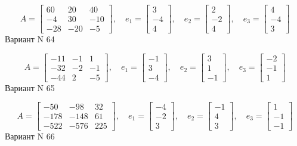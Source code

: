 \documentclass[11pt]{report}
\begin{document}
$$A = \left[\begin{matrix}60 & 20 & 40\\-4 & 30 & -10\\-28 & -20 & -5\end{matrix}\right],\quad e_1 = \left[\begin{matrix}3\\-4\\4\end{matrix}\right],\quad e_2 = \left[\begin{matrix}2\\-2\\4\end{matrix}\right],\quad e_3 = \left[\begin{matrix}4\\-4\\3\end{matrix}\right]$$Вариант N 64

$$A = \left[\begin{matrix}-11 & -1 & 1\\-32 & -2 & -1\\-44 & 2 & -5\end{matrix}\right],\quad e_1 = \left[\begin{matrix}-1\\3\\-4\end{matrix}\right],\quad e_2 = \left[\begin{matrix}3\\1\\-1\end{matrix}\right],\quad e_3 = \left[\begin{matrix}-2\\-1\\1\end{matrix}\right]$$Вариант N 65

$$A = \left[\begin{matrix}-50 & -98 & 32\\-178 & -148 & 61\\-522 & -576 & 225\end{matrix}\right],\quad e_1 = \left[\begin{matrix}-4\\-2\\3\end{matrix}\right],\quad e_2 = \left[\begin{matrix}-1\\4\\3\end{matrix}\right],\quad e_3 = \left[\begin{matrix}1\\-1\\-1\end{matrix}\right]$$Вариант N 66
\end{document}
